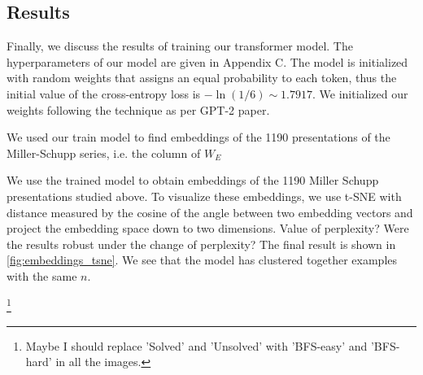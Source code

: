 \subsection{Results}
Finally, we discuss the results of training our transformer model. The hyperparameters of our model are given in Appendix C. The model is initialized with random weights that assigns an equal probability to each token, thus the initial value of the cross-entropy loss is $-\ln(1/6) \sim 1.7917$. We initialized our weights following the technique as per GPT-2 paper.

We used our train model to find embeddings of the 1190 presentations of the Miller-Schupp series, i.e. the column of $W_E$

We use the trained model to obtain embeddings of the 1190 Miller Schupp presentations studied above.
To visualize these embeddings, we use t-SNE with distance measured by the cosine of the angle between two embedding vectors and project the embedding space down to two dimensions.   Value of perplexity? Were the results robust under the change of perplexity?
The final result is shown in \autoref{fig:embeddings_tsne}.
We see that the model has clustered together examples with the same $n$.

\footnote{Maybe I should replace 'Solved' and 'Unsolved' with 'BFS-easy' and 'BFS-hard' in all the images.}

